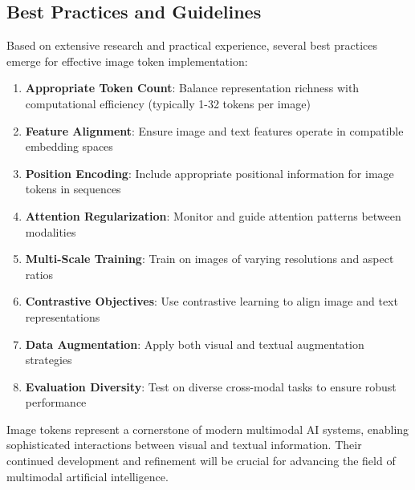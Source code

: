 \subsection{Best Practices and Guidelines}

Based on extensive research and practical experience, several best practices emerge for effective image token implementation:

\begin{enumerate}
\item \textbf{Appropriate Token Count}: Balance representation richness with computational efficiency (typically 1-32 tokens per image)
\item \textbf{Feature Alignment}: Ensure image and text features operate in compatible embedding spaces
\item \textbf{Position Encoding}: Include appropriate positional information for image tokens in sequences
\item \textbf{Attention Regularization}: Monitor and guide attention patterns between modalities
\item \textbf{Multi-Scale Training}: Train on images of varying resolutions and aspect ratios
\item \textbf{Contrastive Objectives}: Use contrastive learning to align image and text representations
\item \textbf{Data Augmentation}: Apply both visual and textual augmentation strategies
\item \textbf{Evaluation Diversity}: Test on diverse cross-modal tasks to ensure robust performance
\end{enumerate}
\begin{comment}
Feedback: This is a good list. To make it more actionable:
1.  **Appropriate Token Count**: "For tasks like VQA or captioning, start with a multi-token approach (e.g., 8-32 tokens) as it generally provides a richer signal. For simple image-text retrieval, a single global image token might be sufficient and more efficient."
2.  **Feature Alignment**: "Use a dedicated linear projection layer to map your visual features into the text embedding dimension. Do not simply truncate or pad the visual features, as this will destroy learned information. Initialize this layer carefully."
3.  **Contrastive Objectives**: "Contrastive pre-training (like CLIP) is the de-facto standard for building powerful, aligned vision-language models. It is highly recommended as a pre-training step before fine-tuning on specific downstream tasks."
\end{comment}

Image tokens represent a cornerstone of modern multimodal AI systems, enabling sophisticated interactions between visual and textual information. Their continued development and refinement will be crucial for advancing the field of multimodal artificial intelligence.
